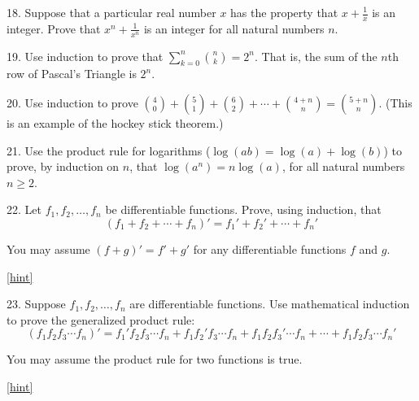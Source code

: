 \documentclass[10pt,]{book}
\theoremstyle{plain}
\theoremstyle{definition}
\theoremstyle{definition}
\theoremstyle{definition}
\numberwithin{equation}{chapter}
\def\d{\displaystyle}
\begin{document}
\begin{exerciselist}
\par\smallskip
\item[18.]\hypertarget{exercise-152}{}\hypertarget{p-2741}{}%
Suppose that a particular real number \(x\) has the property that \(x + \frac{1}{x}\) is an integer. Prove that \(x^n + \frac{1}{x^n}\) is an integer for all natural numbers \(n\).%
\par\smallskip
\item[19.]\hypertarget{exercise-153}{}\hypertarget{p-2744}{}%
Use induction to prove that \(\d\sum_{k=0}^n {n \choose k} = 2^n\). That is, the sum of the \(n\)th row of Pascal's Triangle is \(2^n\).%
\par\smallskip
\item[20.]\hypertarget{exercise-154}{}\hypertarget{p-2745}{}%
Use induction to prove \({4 \choose 0} + {5 \choose 1} + {6 \choose 2} + \cdots + {4+n \choose n} = {5+n \choose n}\). (This is an example of the hockey stick theorem.)%
\par\smallskip
\item[21.]\hypertarget{exercise-155}{}\hypertarget{p-2746}{}%
Use the product rule for logarithms (\(\log(ab) = \log(a) + \log(b)\)) to prove, by induction on \(n\), that \(\log(a^n) = n \log(a)\), for all natural numbers \(n \ge 2\).%
\par\smallskip
\item[22.]\hypertarget{exercise-156}{}\hypertarget{p-2749}{}%
Let \(f_1, f_2,\ldots, f_n\) be differentiable functions. Prove, using induction, that%
\begin{equation*}
(f_1 + f_2 + \cdots + f_n)' = f_1' + f_2' + \cdots + f_n'
\end{equation*}
%
\par
\hypertarget{p-2750}{}%
You may assume \((f+g)' = f' + g'\) for any differentiable functions \(f\) and \(g\).%
\par\smallskip
\hfill{\tiny\hyperlink{a-B.6.22}{[hint]}\hypertarget{q-B.6.22}{}}\item[23.]\hypertarget{exercise-157}{}\hypertarget{p-2752}{}%
Suppose \(f_1, f_2, \ldots, f_n\) are differentiable functions. Use mathematical induction to prove the generalized product rule:%
\begin{equation*}
(f_1 f_2 f_3 \cdots f_n)' = f_1' f_2 f_3 \cdots f_n + f_1 f_2' f_3 \cdots f_n + f_1 f_2 f_3' \cdots f_n + \cdots + f_1 f_2 f_3 \cdots f_n'
\end{equation*}
%
\par
\hypertarget{p-2753}{}%
You may assume the product rule for two functions is true.%
\par\smallskip
\hfill{\tiny\hyperlink{a-B.6.23}{[hint]}\hypertarget{q-B.6.23}{}}\end{exerciselist}
\typeout{************************************************}
\typeout{************************************************}
\end{document}
